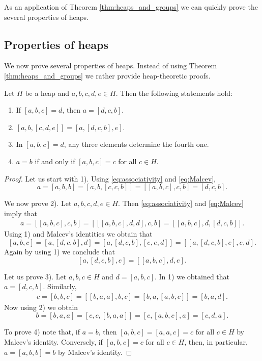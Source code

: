 \documentclass{svmult}
\begin{document}
As an application of Theorem \ref{thm:heaps_and_groups} we can quickly prove
the several properties of heaps. 

\subsection{Properties of heaps}

We now prove several properties of heaps. Instead of using Theorem \ref{thm:heaps_and_groups}
we rather provide heap-theoretic proofs. 

\begin{theorem}
\label{thm:properties}
Let $H$ be a heap and $a,b,c,d,e\in H$. Then the following statements hold:
\begin{enumerate}
    \item If $[a,b,c]=d$, then $a=[d,c,b]$. 
    \item $[a,b,[c,d,e]]=[a,[d,c,b],e]$.
    \item In $[a,b,c]=d$, any three elements determine the fourth one. 
    \item $a=b$ if and only 
        if $[a,b,c]=c$ for all $c\in H$. 
\end{enumerate}
\end{theorem}

\begin{proof}
Let us start with 1). Using \eqref{eq:associativity} and \eqref{eq:Malcev}, 
\[
a=[a,b,b]=[a,b,[c,c,b]]=[[a,b,c],c,b]=[d,c,b].
\]

We now prove 2). Let $a,b,c,d,e\in H$. Then \eqref{eq:associativity} and \eqref{eq:Malcev} imply that
\begin{align*}
    a=[[a,b,c],c,b]=\left[[[a,b,c],d,d],c,b\right]=\left[[a,b,c],d,[d,c,b]\right].
\end{align*}
Using 1) and Malcev's identities we obtain that
\[
[a,b,c]=\left[a,[d,c,b],d\right]=\left[a,[d,c,b],[e,e,d]\right]=\left[[a,[d,c,b],e],e,d\right].
\]
Again by using 1) we conclude that
\[
[a,[d,c,b],e]=\left[[a,b,c],d,e\right].
\]


Let us prove 3). Let $a,b,c\in H$ and $d=[a,b,c]$. In 1) 
we obtained that $a=[d,c,b]$. Similarly,  
\begin{align*}
\label{eq:Iknow3}
c=[b,b,c]=[[b,a,a],b,c]=[b,a,[a,b,c]]=[b,a,d].
\end{align*}
Now using 2) we obtain
\[
b=[b,a,a]=[c,c,[b,a,a]]=[c,[a,b,c],a]=[c,d,a].
\]

To prove 4) note that, if $a=b$, then $[a,b,c]=[a,a,c]=c$ for all $c\in H$ 
by Malcev's identity. Conversely,
if $[a,b,c]=c$ for all $c\in H$, then, 
in particular, $a=[a,b,b]=b$ by Malcev's identity. 
\end{proof}
\end{document}
